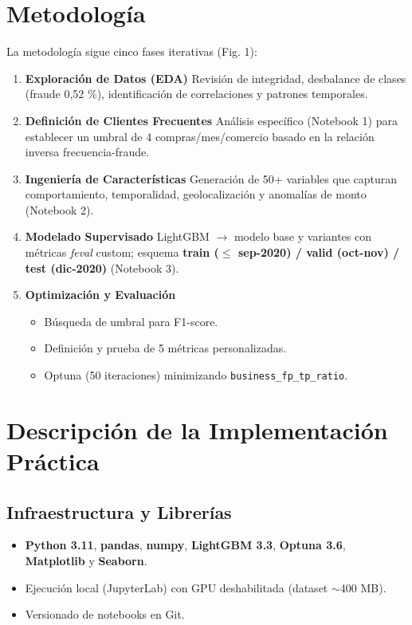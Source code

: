 \documentclass[a4paper,12pt]{article}
\begin{document}
\section{Metodología}
La metodología sigue cinco fases iterativas (Fig. 1):
\begin{enumerate}
    \item \textbf{Exploración de Datos (EDA)} Revisión de integridad, desbalance de clases (fraude 0,52 \si{\percent}), identificación de correlaciones y patrones temporales.
    \item \textbf{Definición de Clientes Frecuentes} Análisis específico (Notebook 1) para establecer un umbral de 4 compras/mes/comercio basado en la relación inversa frecuencia-fraude.
    \item \textbf{Ingeniería de Características} Generación de 50+ variables que capturan comportamiento, temporalidad, geolocalización y anomalías de monto (Notebook 2).
    \item \textbf{Modelado Supervisado} LightGBM $\rightarrow$ modelo base y variantes con métricas \textit{feval} custom; esquema \textbf{train ($\leq$ sep-2020) / valid (oct-nov) / test (dic-2020)} (Notebook 3).
    \item \textbf{Optimización y Evaluación}
    \begin{itemize}
        \item Búsqueda de umbral para F1-score.
        \item Definición y prueba de 5 métricas personalizadas.
        \item Optuna (50 iteraciones) minimizando \texttt{business\_fp\_tp\_ratio}.
    \end{itemize}
\end{enumerate}


\section{Descripción de la Implementación Práctica}

\subsection{Infraestructura y Librerías}
\begin{itemize}
    \item \textbf{Python 3.11}, \textbf{pandas}, \textbf{numpy}, \textbf{LightGBM 3.3}, \textbf{Optuna 3.6}, \textbf{Matplotlib} y \textbf{Seaborn}.
    \item Ejecución local (JupyterLab) con GPU deshabilitada (dataset $\sim$400 MB).
    \item Versionado de notebooks en Git.
\end{itemize}
\end{document}
